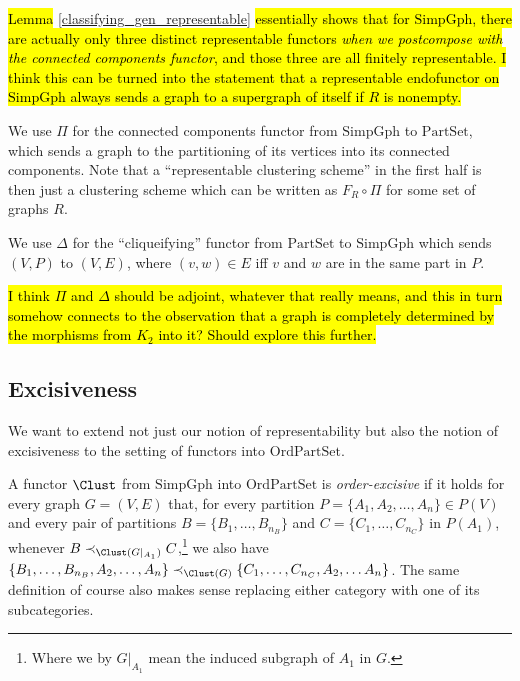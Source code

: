 \documentclass[a4paper,reqno,oneside]{article} %
\begin{document}
\hl{Lemma} \ref{classifying_gen_representable} \hl{essentially shows that for $\mathrm{SimpGph}$, there are actually only three distinct representable functors \emph{when we postcompose with the connected components functor}, and those three are all finitely representable. I think this can be turned into the statement that a representable endofunctor on $\mathrm{SimpGph}$ always sends a graph to a supergraph of itself if $R$ is nonempty.}

\begin{definition}
We use $\Pi$ for the connected components functor from $\mathrm{SimpGph}$ to $\mathrm{PartSet}$, which sends a graph to the partitioning of its vertices into its connected components. Note that a ``representable clustering scheme'' in the first half is then just a clustering scheme which can be written as $F_R \circ \Pi$ for some set of graphs $R$.

We use $\Delta$ for the ``cliqueifying'' functor from $\mathrm{PartSet}$ to $\mathrm{SimpGph}$ which sends $(V,P)$ to $(V,E)$, where $(v,w) \in E$ iff $v$ and $w$ are in the same part in $P$. 
\end{definition}

\hl{I think $\Pi$ and $\Delta$ should be adjoint, whatever that really means, and this in turn somehow connects to the observation that a graph is completely determined by the morphisms from $K_2$ into it? Should explore this further.}

\subsection{Excisiveness}
We want to extend not just our notion of representability but also the notion of excisiveness to the setting of functors into $\mathrm{OrdPartSet}$.

\begin{definition}
A functor $\Clust$ from $\mathrm{SimpGph}$ into $\mathrm{OrdPartSet}$ is \emph{order-excisive} if it holds for every graph $G = (V,E)$ that, for every partition $P = \{A_1, A_2,\ldots, A_n\}\in P(V)$ and every pair of partitions $B = \{B_1,\ldots,B_{n_B}\}$ and $C = \{C_1, \ldots, C_{n_C}\}$ in $P(A_1)$, whenever $B \prec_{\Clust(G|_{A_1})} C$,\footnote{Where we by $G|_{A_1}$ mean the induced subgraph of $A_1$ in $G$.} we also have $\{B_1, \ldots, B_{n_B}, A_2, \ldots, A_n\} \prec_{\Clust(G)} \{C_1, \ldots, C_{n_C}, A_2,\ldots A_n\}$. The same definition of course also makes sense replacing either category with one of its subcategories.
\end{definition}
\end{document}
